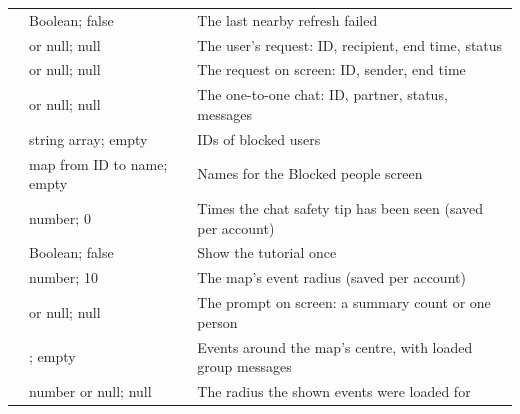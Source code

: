 \begin{longtable}{@{}L{40mm}L{44mm}L{\dimexpr\linewidth-84mm-4\tabcolsep\relax}@{}}
   & Boolean; false & The last nearby refresh failed \\
   &  or null; null & The user's request: ID, recipient, end time, status \\
   &  or null; null & The request on screen: ID, sender, end time \\
   &  or null; null & The one-to-one chat: ID, partner, status, messages \\
   & string array; empty & IDs of blocked users \\
   & map from ID to name; empty & Names for the Blocked people screen \\
   & number; 0 & Times the chat safety tip has been seen (saved per account) \\
   & Boolean; false & Show the tutorial once \\
   & number; 10 & The map's event radius (saved per account) \\
   &  or null; null & The prompt on screen: a summary count or one person \\
   & ; empty & Events around the map's centre, with loaded group messages \\
   & number or null; null & The radius the shown events were loaded for \\
\end{longtable}
\endgroup

